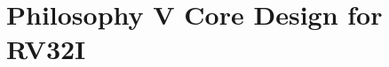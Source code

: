 
\section{Philosophy V Core Design for RV32I}
\label{section:philv_appendix_rv32i_core}
\newpage
 
\thispagestyle{empty}
\newpage